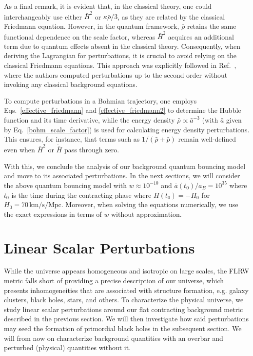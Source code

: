 \documentclass[a4paper,11pt]{article}
\begin{document}
	{
		\color{red} As a final remark, it is evident that, in the classical theory, one
		could interchangeably use either $\bar{H}^2$ or $\kappa \bar{\rho}/3$, as they are
		related by the classical Friedmann equation. However, in the quantum framework,
		$\bar{\rho}$ retains the same functional dependence on the scale factor, whereas
		$\bar{H}^2$ acquires an additional term due to quantum effects absent in the
		classical theory. Consequently, when deriving the Lagrangian for perturbations, it
		is crucial to avoid relying on the classical Friedmann equations. This approach was
		explicitly followed in Ref.~\cite{fluidgeral}, where the authors computed
		perturbations up to the second order without invoking any classical background
		equations.

		To compute perturbations in a Bohmian trajectory, one employs
		Eqs.~\eqref{effective_friedmann} and \eqref{effective_friedmann2} to determine the
		Hubble function and its time derivative, while the energy density $\bar{\rho}
			\propto \bar{a}^{-3}$ (with $\bar{a}$ given by Eq.~\eqref{bohm_scale_factor}) is
		used for calculating energy density perturbations. This ensures, for instance, that
		terms such as $1/(\bar{\rho} + \bar{p})$ remain well-defined even when $\bar{H}^2$
		or $\dot{\bar{H}}$ pass through zero.
	}

With this, we conclude the analysis of our background quantum bouncing model and move to
its associated perturbations. In the next sections, we will consider the above quantum
bouncing model with $w\approx 10^{-10}$ and $\bar{a}(t_0)/a_B = 10^{35}$ where $t_0$ is
the time during the contracting phase where $H(t_0) = -H_0$ for $H_0 = 70 \,
	\text{km/s/Mpc}$. Moreover, when solving the equations numerically, we use the exact
expressions in terms of $w$ without approximation.



\section{Linear Scalar Perturbations}
\label{linearpert}

While the universe appears homogeneous and isotropic on large scales, the FLRW metric
falls short of providing a precise description of our universe, which presents
inhomogeneities that are associated with structure formation, e.g. galaxy clusters,
black holes, stars, and others. To characterize the physical universe, we study linear
scalar perturbations around our flat contracting background metric described in the
previous section. We will then investigate how said perturbations may seed the formation
of primordial black holes in the subsequent section. We will from now on characterize
background quantities with an overbar and perturbed (physical) quantities without it.
\end{document}
